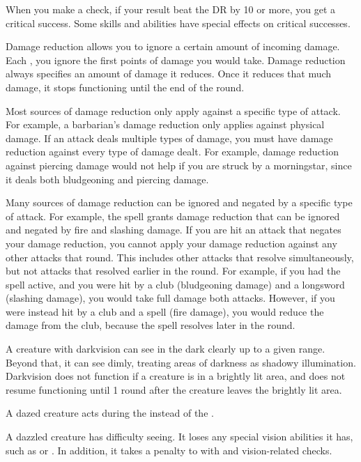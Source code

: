  When you make a check, if your result beat the DR by 10 or more, you get a critical success.
Some skills and abilities have special effects on critical successes.

 Damage reduction allows you to ignore a certain amount of incoming damage.
Each , you ignore the first points of damage you would take.
Damage reduction always specifies an amount of damage it reduces.
Once it reduces that much damage, it stops functioning until the end of the round.

Most sources of damage reduction only apply against a specific type of attack.
For example, a barbarian's damage reduction only applies against physical damage.
If an attack deals multiple types of damage, you must have damage reduction against every type of damage dealt.
For example, damage reduction against piercing damage would not help if you are struck by a morningstar, since it deals both bludgeoning and piercing damage.

Many sources of damage reduction can be ignored and negated by a specific type of attack.
For example, the  spell grants damage reduction that can be ignored and negated by fire and slashing damage.
If you are hit an attack that negates your damage reduction, you cannot apply your damage reduction against any other attacks that round.
This includes other attacks that resolve simultaneously, but not attacks that resolved earlier in the round.
For example, if you had the  spell active, and you were hit by a club (bludgeoning damage) and a longsword (slashing damage), you would take full damage both attacks.
However, if you were instead hit by a club and a  spell (fire damage), you would reduce the damage from the club, because the spell resolves later in the round.

 A creature with darkvision can see in the dark clearly up to a given range.
Beyond that, it can see dimly, treating areas of darkness as shadowy illumination.
Darkvision does not function if a creature is in a brightly lit area, and does not resume functioning until 1 round after the creature leaves the brightly lit area.

 A dazed creature acts during the  instead of the .

 A dazzled creature has difficulty seeing.
It loses any special vision abilities it has, such as  or .
In addition, it takes a  penalty to  with  and vision-related checks.

